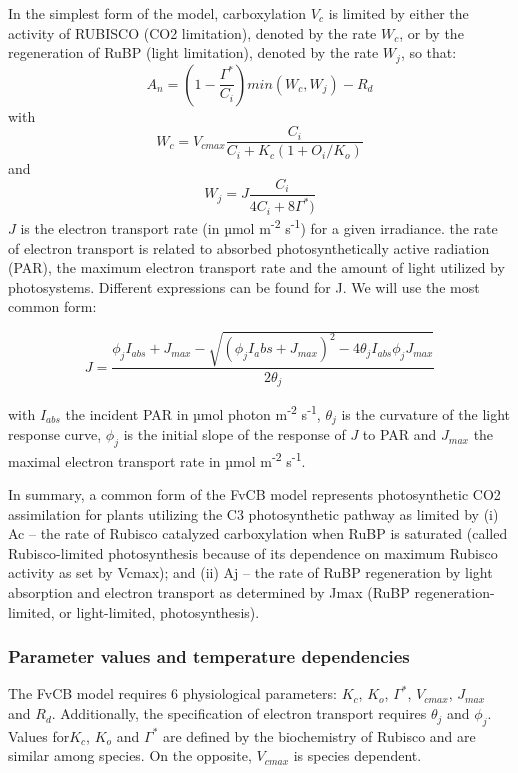 \documentclass[]{article}
\begin{document}
In the simplest form of the model, carboxylation \(V_c\) is limited by
either the activity of RUBISCO (CO2 limitation), denoted by the rate
\(W_c\), or by the regeneration of RuBP (light limitation), denoted by
the rate \(W_j\), so that: \[
A_n=(1-\frac{\Gamma^*}{C_i})min(W_c,W_j)-R_d
\] with \[
W_c=V_{cmax}\frac{C_i}{C_i+K_c(1+O_i/K_o)}
\] and \[
W_j=J\frac{C_i}{4C_i+8\Gamma^*)}
\] \(J\) is the electron transport rate (in µmol m\textsuperscript{-2}
s\textsuperscript{-1}) for a given irradiance. the rate of electron
transport is related to absorbed photosynthetically active radiation
(PAR), the maximum electron transport rate and the amount of light
utilized by photosystems. Different expressions can be found for J. We
will use the most common form:

\[
J=\frac{\phi_jI_{abs}+J_{max}-\sqrt{(\phi_jI_abs+J_{max})^2-4\theta_jI_{abs}\phi_jJ_{max}}}{2\theta_j}
\]

with \(I_{abs}\) the incident PAR in µmol photon m\textsuperscript{-2}
s\textsuperscript{-1}, \(\theta_j\) is the curvature of the light
response curve, \(\phi_j\) is the initial slope of the response of \(J\)
to PAR and \(J_{max}\) the maximal electron transport rate in µmol
m\textsuperscript{-2} s\textsuperscript{-1}.

In summary, a common form of the FvCB model represents photosynthetic
CO2 assimilation for plants utilizing the C3 photosynthetic pathway as
limited by (i) Ac -- the rate of Rubisco catalyzed carboxylation when
RuBP is saturated (called Rubisco-limited photosynthesis because of its
dependence on maximum Rubisco activity as set by Vcmax); and (ii) Aj --
the rate of RuBP regeneration by light absorption and electron transport
as determined by Jmax (RuBP regeneration-limited, or light-limited,
photosynthesis).

\hypertarget{parameter-values-and-temperature-dependencies}{%
\subsubsection{Parameter values and temperature
dependencies}\label{parameter-values-and-temperature-dependencies}}

The FvCB model requires 6 physiological parameters: \(K_c\), \(K_o\),
\(\Gamma^*\), \(V_{cmax}\), \(J_{max}\) and \(R_d\). Additionally, the
specification of electron transport requires \(\theta_j\) and
\(\phi_j\). Values for\(K_c\), \(K_o\) and \(\Gamma^*\) are defined by
the biochemistry of Rubisco and are similar among species. On the
opposite, \(V_{cmax}\) is species dependent.
\end{document}
